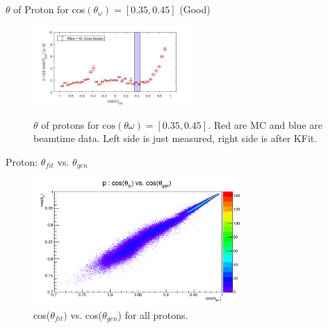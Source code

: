 \documentclass[
		10pt
		]{beamer}
\begin{document}
\begin{frame}{$ \theta$ of Proton for cos$(\theta_{\omega})=[0.35,0.45]$ (Good)}
	
	\begin{figure}
		\hspace{0cm}  \vspace{-1cm}
		\includegraphics[width=6cm]{Plots/9}
	\end{figure}
	
	
	\begin{figure}%
		\centering
		\qquad
		\captionsetup{labelformat=empty}
		\caption{$\theta$ of protons for $\textrm{cos}(\theta{\omega}) = [0.35, 0.45] $. Red are MC and blue are beamtime data. Left side is just measured, right side is after KFit.}%
		\label{fig:example}%
	\end{figure}
	
\end{frame}




\begin{frame}{Proton: $\theta_{fit}$ vs. $\theta_{gen}$}
	\begin{figure}
		\includegraphics[width=8cm]{Plots/MC/1/ThetaTheta1Proton.pdf}
		\captionsetup{labelformat=empty}
		\caption{cos($\theta_{fit})$ vs. cos($\theta_{gen}$) for all protons.}
	\end{figure}
\end{frame}
\end{document}
